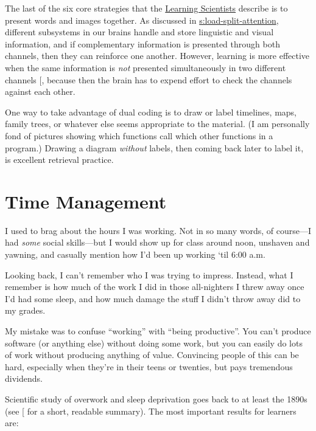 The last of the six core strategies that the \href{http://www.learningscientists.org/}{Learning
Scientists} describe is to present words and
images together. As discussed in \protect\hyperlink{SECTION}{s:load-split-attention},
different subsystems in our brains handle and store linguistic and
visual information, and if complementary information is presented
through both channels, then they can reinforce one another. However,
learning is more effective when the same information is \emph{not}
presented simultaneously in two different channels
{[}\protect[\hyperlink{b:Maye2003}{Maye2003}]{]}, because then the brain has to expend effort to
check the channels against each other.

One way to take advantage of dual coding is to draw or label timelines,
maps, family trees, or whatever else seems appropriate to the material.
(I am personally fond of pictures showing which functions call which
other functions in a program.) Drawing a diagram \emph{without} labels, then
coming back later to label it, is excellent retrieval practice.

\section{Time Management}\label{s:individual-time}

I used to brag about the hours I was working. Not in so many words, of
course---I had \emph{some} social skills---but I would show up for class around
noon, unshaven and yawning, and casually mention how I'd been up working
`til 6:00 a.m.

Looking back, I can't remember who I was trying to impress. Instead,
what I remember is how much of the work I did in those all-nighters I
threw away once I'd had some sleep, and how much damage the stuff I
didn't throw away did to my grades.

My mistake was to confuse ``working'' with ``being productive''. You can't
produce software (or anything else) without doing some work, but you can
easily do lots of work without producing anything of value. Convincing
people of this can be hard, especially when they're in their teens or
twenties, but pays tremendous dividends.

Scientific study of overwork and sleep deprivation goes back to at least
the 1890s (see {[}\protect[\hyperlink{b:Robi2005}{Robi2005}]{]} for a short, readable summary). The
most important results for learners are:

